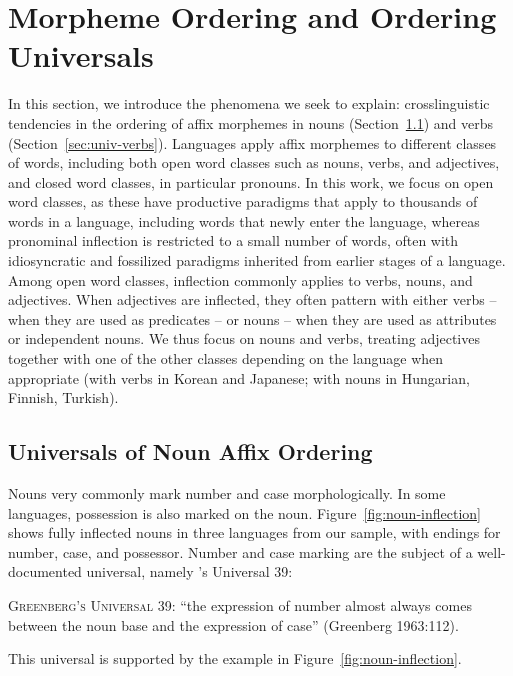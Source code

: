 \documentclass[11pt,letterpaper]{article}
\newcommand{\citet}{\Textcite}
\begin{document}


\section{Morpheme Ordering and Ordering Universals}\label{sec:univ}


In this section, we introduce the phenomena we seek to explain: crosslinguistic tendencies in the ordering of affix morphemes in nouns (Section~\ref{sec:univ-nouns}) and verbs (Section~\ref{sec:univ-verbs}).
Languages apply affix morphemes to different classes of words, including both open word classes such as nouns, verbs, and adjectives, and closed word classes, in particular pronouns.
In this work, we focus on open word classes, as these have productive paradigms that apply to thousands of words in a language, including words that newly enter the language, whereas pronominal inflection is restricted to a small number of words, often with idiosyncratic and fossilized paradigms inherited from earlier stages of a language.
Among open word classes, inflection commonly applies to verbs, nouns, and adjectives.
When adjectives are inflected, they often pattern with either verbs -- when they are used as predicates -- or nouns -- when they are used as attributes or independent nouns.
We thus focus on nouns and verbs, treating adjectives together with one of the other classes depending on the language when appropriate (with verbs in Korean and Japanese; with nouns in Hungarian, Finnish, Turkish).

\subsection{Universals of Noun Affix Ordering}\label{sec:univ-nouns}
Nouns very commonly mark number and case morphologically.
In some languages, possession is also marked on the noun.
Figure~\ref{fig:noun-inflection} shows fully inflected nouns in three languages from our sample, with endings for number, case, and possessor.
Number and case marking are the subject of a well-documented universal, namely \citet{greenberg1963universals}'s Universal 39:

\begin{adjustwidth}{6em}{6em}
\textsc{Greenberg's Universal 39}:
``the expression of number almost always comes between the noun base and the expression of case'' (Greenberg 1963:112).
\end{adjustwidth}
This universal is supported by the example in Figure~\ref{fig:noun-inflection}.
\end{document}
